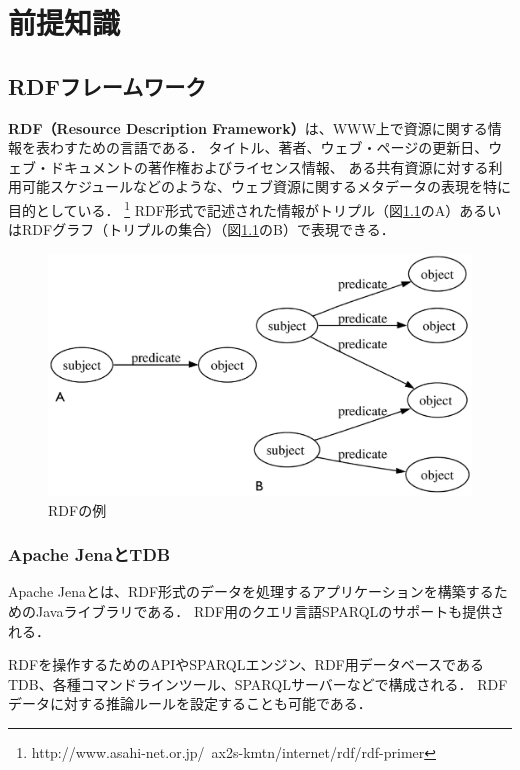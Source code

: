 ﻿%
\chapter{前提知識}

\section{RDFフレームワーク}
\label{knowlegde:rdf}

\textbf{RDF（Resource Description Framework）}は、WWW上で資源に関する情報を表わすための言語である．
タイトル、著者、ウェブ・ページの更新日、ウェブ・ドキュメントの著作権およびライセンス情報、
ある共有資源に対する利用可能スケジュールなどのような、ウェブ資源に関するメタデータの表現を特に目的としている．
\footnote{http://www.asahi-net.or.jp/~ax2s-kmtn/internet/rdf/rdf-primer}
RDF形式で記述された情報がトリプル（図\ref{fig:rdf_triple}のA）あるいはRDFグラフ（トリプルの集合）（図\ref{fig:rdf_triple}のB）で表現できる．

\begin{figure}[h!]
 	\begin{center}
 		\includegraphics[width=160mm]{./images/rdf_sample.eps}
 		\caption{RDFの例}
 		\label{fig:rdf_triple}
 	\end{center}
\end{figure}

\subsection{Apache JenaとTDB}
\label{knowlegde:jena}

Apache Jenaとは、RDF形式のデータを処理するアプリケーションを構築するためのJavaライブラリである．
RDF用のクエリ言語SPARQLのサポートも提供される．

RDFを操作するためのAPIやSPARQLエンジン、RDF用データベースであるTDB、各種コマンドラインツール、SPARQLサーバーなどで構成される．
RDFデータに対する推論ルールを設定することも可能である．

